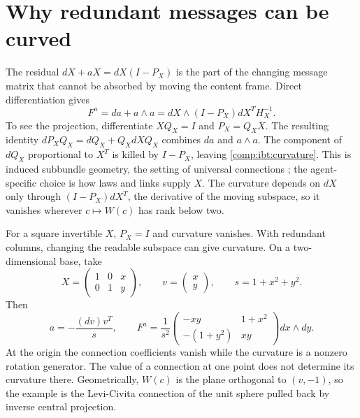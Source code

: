 \section{Why redundant messages can be curved}

The residual $dX+aX=dX(I-P_X)$ is the part of the changing message matrix that cannot be absorbed by moving the content frame. Direct differentiation gives
\begin{equation}
F^a=da+a\wedge a
=dX\wedge(I-P_X)dX^TH_X^{-1}.
\label{comp:ibt:curvature}
\end{equation}
To see the projection, differentiate $XQ_X=I$ and $P_X=Q_XX$. The resulting identity $dP_XQ_X=dQ_X+Q_XdXQ_X$ combines $da$ and $a\wedge a$. The component of $dQ_X$ proportional to $X^T$ is killed by $I-P_X$, leaving \cref{comp:ibt:curvature}. This is induced subbundle geometry, the setting of universal connections \citep{NarasimhanRamanan1961,NarasimhanRamanan1963,MassambaThompson2003}; the agent-specific choice is how laws and links supply $X$. The curvature depends on $dX$ only through $(I-P_X)dX^T$, the derivative of the moving subspace, so it vanishes wherever $c\mapsto W(c)$ has rank below two.

For a square invertible $X$, $P_X=I$ and curvature vanishes. With redundant columns, changing the readable subspace can give curvature. On a two-dimensional base, take
\begin{equation}
X=\begin{pmatrix}1&0&x\\0&1&y\end{pmatrix},\qquad
v=\begin{pmatrix}x\\y\end{pmatrix},\qquad s=1+x^2+y^2.
\end{equation}
Then
\begin{equation}
a=-\frac{(dv)v^T}{s},\qquad
F^a=\frac{1}{s^2}
\begin{pmatrix}-xy&1+x^2\\-(1+y^2)&xy\end{pmatrix}dx\wedge dy.
\end{equation}
At the origin the connection coefficients vanish while the curvature is a nonzero rotation generator. The value of a connection at one point does not determine its curvature there. Geometrically, $W(c)$ is the plane orthogonal to $(v,-1)$, so the example is the Levi-Civita connection of the unit sphere pulled back by inverse central projection.

